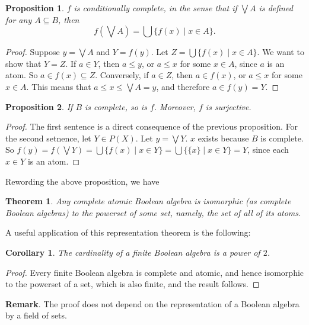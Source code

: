 \documentclass[12pt]{article}
\newtheorem{prop}{Proposition}
\newtheorem{thm}{Theorem}
\newtheorem{cor}{Corollary}
\begin{document}
\begin{prop} $f$ is conditionally complete, in the sense that if $\bigvee A$ is defined for any $A\subseteq B$, then $$f(\bigvee A)=\bigcup \lbrace f(x)\mid x\in A\rbrace.$$ \end{prop}
\begin{proof}  Suppose $y=\bigvee A$ and $Y=f(y)$.  Let $Z=\bigcup \lbrace f(x) \mid x\in A \rbrace$.  We want to show that $Y=Z$.  If $a\in Y$, then $a\le y$, or $a\le x$ for some $x \in A$, since $a$ is an atom.  So $a\in f(x)\subseteq Z$.  Conversely, if $a\in Z$, then $a\in f(x)$, or $a\le x$ for some $x\in A$.  This means that $a\le x \le \bigvee A =y$, and therefore $a\in f(y)=Y$.
\end{proof}

\begin{prop} If $B$ is complete, so is $f$.  Moreover, $f$ is surjective.  \end{prop}
\begin{proof} The first sentence is a direct consequence of the previous proposition.  For the second setnence, let $Y\in P(X)$.  Let $y=\bigvee Y$.  $x$ exists because $B$ is complete.  So $f(y)=f(\bigvee Y) = \bigcup \lbrace f(x) \mid x \in Y \rbrace = \bigcup \lbrace \lbrace x\rbrace \mid x\in Y\rbrace = Y$, since each $x\in Y$ is an atom.  \end{proof}

Rewording the above proposition, we have
\begin{thm} Any complete atomic Boolean algebra is isomorphic (as complete Boolean algebras) to the powerset of some set, namely, the set of all of its atoms.  \end{thm}

A useful application of this representation theorem is the following:
\begin{cor} The cardinality of a finite Boolean algebra is a power of $2$. \end{cor}
\begin{proof} Every finite Boolean algebra is complete and atomic, and hence isomorphic to the powerset of a set, which is also finite, and the result follows. \end{proof}

\textbf{Remark}.  The proof does not depend on the representation of a Boolean algebra by a field of sets.
\end{document}
